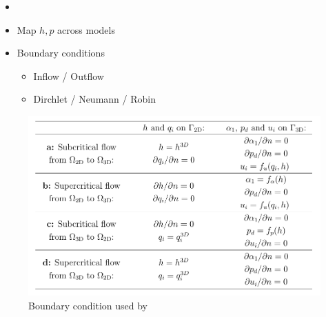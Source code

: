 \begin{frame}
\begin{multicols}{2}
\begin{itemize}
\item<2->[] \\[2cm]
\item<3-> \hspace{0.23\columnwidth} Map $h, p$ across models\\[1cm]
\item<4-> \hspace{0.23\columnwidth} Boundary conditions
\begin{itemize}
 \setlength{\itemindent}{3.5cm}
\vspace{0.2cm}
\item<5-> Inflow / Outflow
\item<5-> Dirchlet / Neumann / Robin
\end{itemize}
\end{itemize}
\end{multicols}
\end{frame}

\begin{frame}
\begin{figure}
\includegraphics[scale=0.44]{./Resources/Images/bcs_mintgen.png}
\caption{Boundary condition used by \cite{mintgen}}
\end{figure}
\end{frame}

